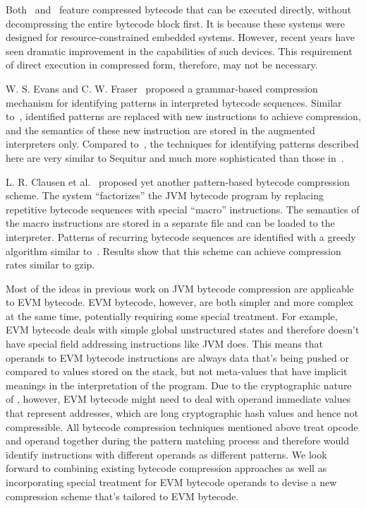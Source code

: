 Both~\cite{aslam2010} and~\cite{marc2003} feature compressed bytecode that can be executed directly, without decompressing
the entire bytecode block first. It is because these systems were designed for resource-constrained embedded systems.
However, recent years have seen dramatic improvement in the capabilities of such devices.
This requirement of direct execution in compressed form, therefore, may not be necessary.

W. S. Evans and C. W. Fraser~\cite{evans2003} proposed a grammar-based compression mechanism for identifying patterns in
interpreted bytecode sequences.
Similar to~\cite{aslam2010}, identified patterns are replaced with new instructions to achieve compression, and the semantics
of these new instruction are stored in the augmented interpreters only. Compared to~\cite{aslam2010}, the techniques for
identifying patterns described here are very similar to Sequitur and much more sophisticated than those in~\cite{aslam2010}.

L. R. Clausen et al.~\cite{clausen2000} proposed yet another pattern-based bytecode compression scheme. The system ``factorizes''
the JVM bytecode program by replacing repetitive bytecode sequences with special ``macro'' instructions. The semantics of the
macro instructions are stored in a separate file and can be loaded to the interpreter. Patterns of recurring bytecode sequences
are identified with a greedy algorithm similar to~\cite{aslam2010}. Results show that this scheme can achieve compression rates
similar to gzip.

Most of the ideas in previous work on JVM bytecode compression are applicable to EVM bytecode. EVM bytecode, however, are
both simpler and more complex at the same time, potentially requiring some special treatment. For example, EVM bytecode deals
with simple global unstructured states and therefore doesn't have special field addressing instructions like JVM does.
This means that operands to EVM bytecode instructions are always data that's being pushed or compared to values stored on
the stack, but not meta-values that have implicit meanings in the interpretation of the program.
Due to the cryptographic nature of \eth{}, however, EVM bytecode might need to deal with operand immediate values that
represent \eth{} addresses, which are long cryptographic hash values and hence not compressible. All bytecode compression
techniques mentioned above treat opcode and operand together during the pattern matching process and therefore would identify
instructions with different operands as different patterns.
We look forward to combining existing bytecode compression approaches as well as incorporating special treatment for EVM
bytecode operands to devise a new compression scheme that's tailored to EVM bytecode.

